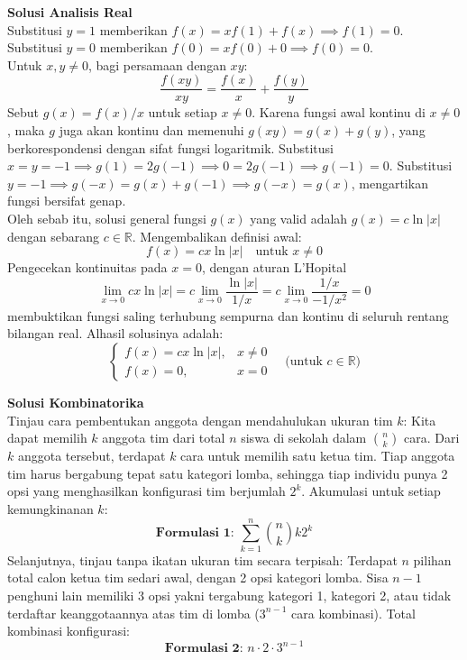 \documentclass{article}
\begin{document}
\textbf{Solusi Analisis Real} \\
Substitusi $y = 1$ memberikan $f(x) = xf(1) + f(x) \implies f(1)=0$. \\
Substitusi $y = 0$ memberikan $f(0) = xf(0) + 0 \implies f(0)=0$. \\
Untuk $x,y \neq 0$, bagi persamaan dengan $xy$:
\[ \frac{f(xy)}{xy} = \frac{f(x)}{x} + \frac{f(y)}{y} \]
Sebut $g(x) = f(x)/x$ untuk setiap $x \neq 0$. Karena fungsi awal kontinu di $x \neq 0$, maka $g$ juga akan kontinu dan memenuhi $g(xy) = g(x) + g(y)$, yang berkorespondensi dengan sifat fungsi logaritmik.
Substitusi $x = y = -1 \implies g(1) = 2g(-1) \implies 0=2g(-1) \implies g(-1)=0$.
Substitusi $y = -1 \implies g(-x) = g(x) + g(-1) \implies g(-x) = g(x)$, mengartikan fungsi bersifat genap. \\
Oleh sebab itu, solusi general fungsi $g(x)$ yang valid adalah $g(x) = c\ln|x|$ dengan sebarang $c \in \mathbb{R}$.
Mengembalikan definisi awal:
\[ f(x) = cx\ln|x| \quad \text{untuk } x \neq 0 \]
Pengecekan kontinuitas pada $x=0$, dengan aturan L'Hopital $$\lim_{x \to 0} cx\ln|x| = c \lim_{x \to 0} \frac{\ln|x|}{1/x} = c \lim_{x \to 0} \frac{1/x}{-1/x^2} = 0$$ membuktikan fungsi saling terhubung sempurna dan kontinu di seluruh rentang bilangan real. Alhasil solusinya adalah:
\[ \begin{cases} f(x) = c x \ln|x|, & x \neq 0 \\ f(x) = 0, & x = 0 \end{cases} \quad \text{(untuk } c \in \mathbb{R} \text{)} \]

\vspace{0.5cm}

\textbf{Solusi Kombinatorika} \\
Tinjau cara pembentukan anggota dengan mendahulukan ukuran tim $k$:
Kita dapat memilih $k$ anggota tim dari total $n$ siswa di sekolah dalam $\binom{n}{k}$ cara. Dari $k$ anggota tersebut, terdapat $k$ cara untuk memilih satu ketua tim. Tiap anggota tim harus bergabung tepat satu kategori lomba, sehingga tiap individu punya 2 opsi yang menghasilkan konfigurasi tim berjumlah $2^k$. Akumulasi untuk setiap kemungkinanan $k$:
\[ \textbf{Formulasi 1: } \sum_{k=1}^n \binom{n}{k} k 2^k \]
Selanjutnya, tinjau tanpa ikatan ukuran tim secara terpisah:
Terdapat $n$ pilihan total calon ketua tim sedari awal, dengan 2 opsi kategori lomba. Sisa $n-1$ penghuni lain memiliki 3 opsi yakni tergabung kategori 1, kategori 2, atau tidak terdaftar keanggotaannya atas tim di lomba ($3^{n-1}$ cara kombinasi). Total kombinasi konfigurasi:
\[ \textbf{Formulasi 2: } n \cdot 2 \cdot 3^{n-1} \]
\end{document}
